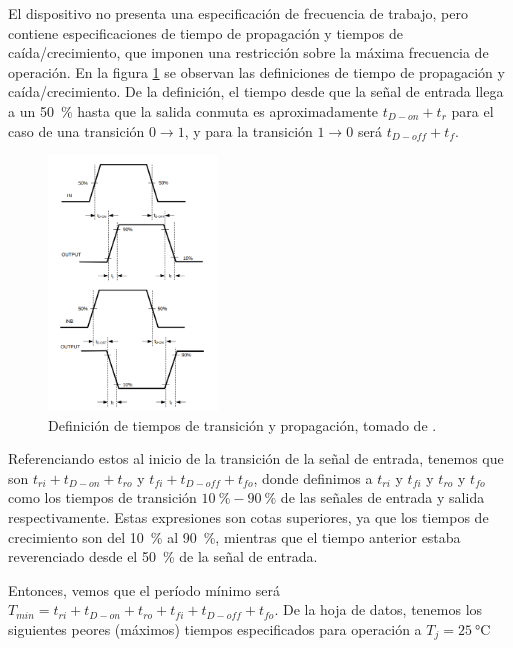 El dispositivo no presenta una especificación de frecuencia de trabajo, pero
contiene especificaciones de tiempo de propagación y tiempos de
caída/crecimiento, que imponen una restricción sobre la máxima frecuencia de
operación. En la figura \ref{fig:lm5114_timing_definitions} se observan las
definiciones de tiempo de propagación y caída/crecimiento. De la definición, el
tiempo desde que la señal de entrada llega a un \qty{50}{\percent} hasta que la
salida conmuta es aproximadamente $t_{D-on}+t_{r}$ para el caso de una
transición $0\to1$, y para la transición $1\to0$ será $t_{D-off}+t_{f}$.

\begin{figure}[tbp]
    \centering
    \includegraphics[width=0.4\textwidth]{images/lm5114_timing_definitions.png}
    \caption{Definición de tiempos de transición y propagación, tomado de
    \cite{LM5114_datasheet}.}
    \label{fig:lm5114_timing_definitions}
\end{figure}

Referenciando estos al inicio de la transición de la señal de entrada, tenemos
que son $t_{ri}+t_{D-on}+t_{ro}$ y $t_{fi}+t_{D-off}+t_{fo}$, donde definimos a
$t_{ri}$ y $t_{fi}$ y $t_{ro}$ y $t_{fo}$ como los tiempos de transición
$\qty{10}{\percent}-\qty{90}{\percent}$ de las señales de entrada y salida
respectivamente. Estas expresiones son cotas superiores, ya que los tiempos de
crecimiento son del \qty{10}{\percent} al \qty{90}{\percent}, mientras que el
tiempo anterior estaba reverenciado desde el \qty{50}{\percent} de la señal de
entrada.

Entonces, vemos que el período mínimo será $T_{min} = t_{ri} + t_{D-on} + t_{ro}
+ t_{fi} + t_{D-off} + t_{fo}$. De la hoja de datos, tenemos los siguientes
peores (máximos) tiempos especificados para operación a $T_j=\qty{25}{\celsius}$

